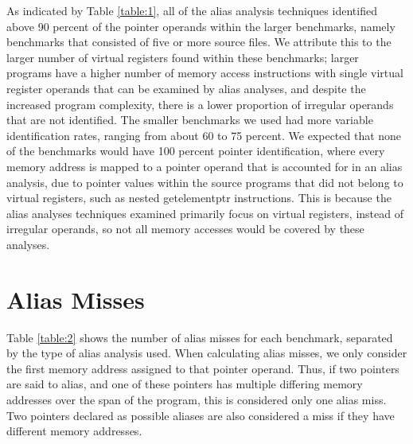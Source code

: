 As indicated by Table \ref{table:1}, all of the alias analysis techniques identified above 90 percent of the pointer operands within the larger benchmarks, namely benchmarks that consisted of five or more source files. We attribute this to the larger number of virtual registers found within these benchmarks; larger programs have a higher number of memory access instructions with single virtual register operands that can be examined by alias analyses, and despite the increased program complexity, there is a lower proportion of irregular operands that are not identified. The smaller benchmarks we used had more variable identification rates, ranging from about 60 to 75 percent. We expected that none of the benchmarks would have 100 percent pointer identification, where every memory address is mapped to a pointer operand that is accounted for in an alias analysis, due to pointer values within the source programs that did not belong to virtual registers, such as nested getelementptr instructions. This is because the alias analyses techniques examined primarily focus on virtual registers, instead of irregular operands, so not all memory accesses would be covered by these analyses.

\section{Alias Misses}
Table \ref{table:2} shows the number of alias misses for each benchmark, separated by the type of alias analysis used. When calculating alias misses, we only consider the first memory address assigned to that pointer operand. Thus, if two pointers are said to alias, and one of these pointers has multiple differing memory addresses over the span of the program, this is considered only one alias miss. Two pointers declared as possible aliases are also considered a miss if they have different memory addresses.


